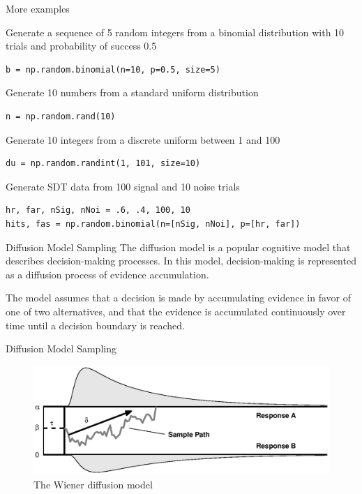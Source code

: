 \documentclass{beamer}
\begin{document}
\begin{frame}[fragile]{More examples}

Generate a sequence of 5 random integers from a binomial distribution with 10 trials and probability of success 0.5
    \begin{lstlisting}[style=python]
b = np.random.binomial(n=10, p=0.5, size=5)
    \end{lstlisting}

Generate 10 numbers from a standard uniform distribution
    \begin{lstlisting}[style=python]
n = np.random.rand(10)
    \end{lstlisting}

Generate 10 integers from a discrete uniform between 1 and 100
    \begin{lstlisting}[style=python]
du = np.random.randint(1, 101, size=10)
    \end{lstlisting}
    
Generate SDT data from 100 signal and 10 noise trials
    \begin{lstlisting}[style=python]
hr, far, nSig, nNoi = .6, .4, 100, 10
hits, fas = np.random.binomial(n=[nSig, nNoi], p=[hr, far])
    \end{lstlisting}

\end{frame}






\begin{frame}{Diffusion Model Sampling}
The diffusion model is a popular cognitive model that describes decision-making processes. In this model, decision-making is represented as a diffusion process of evidence accumulation.

The model assumes that a decision is made by accumulating evidence in favor of one of two alternatives, and that the evidence is accumulated continuously over time until a decision boundary is reached.
\end{frame}


\begin{frame}{Diffusion Model Sampling}
\begin{figure}[htp]
\centering
\includegraphics[scale=0.7]{wdm.eps}
\caption{The Wiener diffusion model}
\label{}
\end{figure}
\end{frame}
\end{document}
